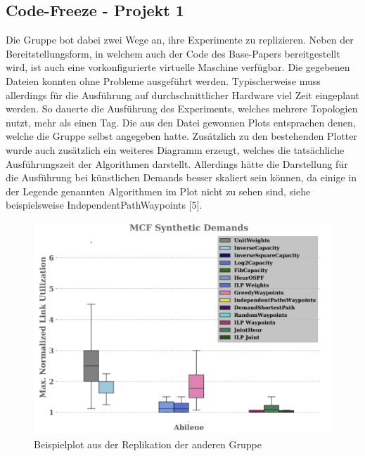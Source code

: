 \documentclass[sigconf,noacm,review]{acmart}
\begin{document}
\subsection{Code-Freeze - Projekt 1}
Die Gruppe bot dabei zwei Wege an, ihre Experimente zu replizieren. Neben der Bereitstellungsform, in welchem auch der Code des Base-Papers bereitgestellt wird, ist auch eine vorkonfigurierte virtuelle Maschine verfügbar.
Die gegebenen Dateien konnten ohne Probleme ausgeführt werden. Typischerweise muss allerdings für die Ausführung auf durchschnittlicher Hardware viel Zeit eingeplant werden.
So dauerte die Ausführung des Experiments, welches mehrere Topologien nutzt, mehr als einen Tag. 
Die aus den Datei gewonnen Plots entsprachen denen, welche die Gruppe selbst angegeben hatte.
Zusätzlich zu den bestehenden Plotter wurde auch zusätzlich ein weiteres Diagramm erzeugt, 
welches die tatsächliche Ausführungszeit der Algorithmen darstellt. Allerdings hätte die Darstellung für die Ausführung bei künstlichen Demands besser skaliert sein können, da einige in der Legende genannten Algorithmen im Plot nicht zu sehen sind, siehe beispielsweise IndependentPathWaypoints [5]. 
\begin{figure}[h]
  \centering
  \includegraphics[width=\linewidth]{abbildungen/replik1}
  \caption{Beispielplot aus der Replikation der anderen Gruppe}
\end{figure}
\end{document}
